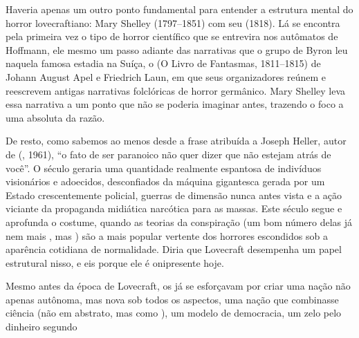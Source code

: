 \begin{multicols}{2}
Haveria apenas um outro ponto fundamental para entender a estrutura
mental do horror lovecraftiano: Mary Shelley (1797--1851) com seu
{} (1818). Lá se encontra
pela primeira vez o tipo de
horror científico que se entrevira nos autômatos de Hoffmann, ele mesmo
um passo adiante das narrativas que o grupo de Byron leu naquela famosa
estadia na Suíça, o {} (O Livro de Fantasmas, 1811--1815)
de Johann August Apel e Friedrich Laun, em que seus organizadores reúnem
e reescrevem antigas narrativas folclóricas de horror germânico. Mary
Shelley leva essa narrativa a um ponto que não se poderia imaginar
antes, trazendo o foco a uma absoluta {} da razão.

De resto, como sabemos ao menos desde a frase atribuída a Joseph Heller,
autor de {} ({}, 1961), ``o fato de ser
paranoico não quer dizer que não estejam atrás de você''. O século 
geraria uma quantidade realmente espantosa de indivíduos visionários e
adoecidos, desconfiados da máquina gigantesca gerada por um Estado
crescentemente policial, guerras de dimensão nunca antes vista e a ação
viciante da propaganda midiática narcótica para as massas. Este século
 segue e aprofunda o costume, quando as teorias da conspiração (um
bom número delas já nem mais {}, mas {}) são a mais popular vertente dos horrores escondidos sob a
aparência cotidiana de normalidade. Diria que Lovecraft desempenha um
papel estrutural nisso, 
e eis porque ele é
onipresente hoje.


Mesmo antes da época de Lovecraft, os  já se esforçavam por criar uma nação não apenas autônoma, mas nova sob todos os aspectos, uma nação que
combinasse ciência (não em abstrato, mas como {}),
um modelo de democracia, um
zelo pelo dinheiro segundo


\end{multicols}
